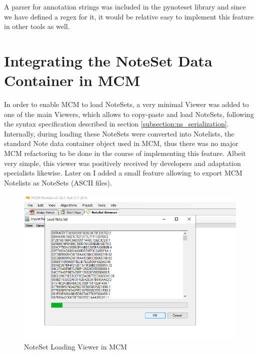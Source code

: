 A parser for annotation strings was included in the pynoteset library and since we have defined a regex for it, it would be relative easy to implement this feature in other tools as well.

\section{Integrating the NoteSet Data Container in MCM}
In order to enable MCM to load NoteSets, a very minimal Viewer was added to one of the main Viewers, which allows to copy-paste and load NoteSets, following the syntax specification described in section \ref{subsection:ns_serialization}. Internally, during loading these NoteSets were converted into Notelists, the standard Note data container object used in MCM, thus there was no major MCM refactoring to be done in the course of implementing this feature. Albeit very simple, this viewer was positively received by developers and adaptation specialists likewise. Later on I added a small feature allowing to export MCM Notelists as NoteSets (ASCII files).
\begin{figure}
 \includegraphics[width=\linewidth]{images/mcm_ns_Loader.png}
   \caption{NoteSet Loading Viewer in MCM}\label{fig:ns_loader}
\end{figure}